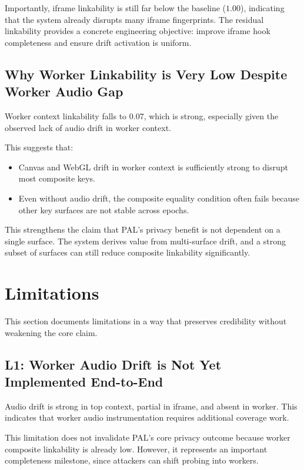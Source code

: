 \documentclass[11pt]{report}
\begin{document}
Importantly, iframe linkability is still far below the baseline ($1.00$), indicating that the system already disrupts many iframe fingerprints. The residual linkability provides a concrete engineering objective: improve iframe hook completeness and ensure drift activation is uniform.

\subsection{Why Worker Linkability is Very Low Despite Worker Audio Gap}

Worker context linkability falls to $0.07$, which is strong, especially given the observed lack of audio drift in worker context.

This suggests that:

\begin{itemize}
    \item Canvas and WebGL drift in worker context is sufficiently strong to disrupt most composite keys.
    \item Even without audio drift, the composite equality condition often fails because other key surfaces are not stable across epochs.
\end{itemize}

This strengthens the claim that PAL’s privacy benefit is not dependent on a single surface. The system derives value from multi-surface drift, and a strong subset of surfaces can still reduce composite linkability significantly.

\section{Limitations}

This section documents limitations in a way that preserves credibility without weakening the core claim.

\subsection{L1: Worker Audio Drift is Not Yet Implemented End-to-End}

Audio drift is strong in top context, partial in iframe, and absent in worker. This indicates that worker audio instrumentation requires additional coverage work.

This limitation does not invalidate PAL’s core privacy outcome because worker composite linkability is already low. However, it represents an important completeness milestone, since attackers can shift probing into workers.
\end{document}
